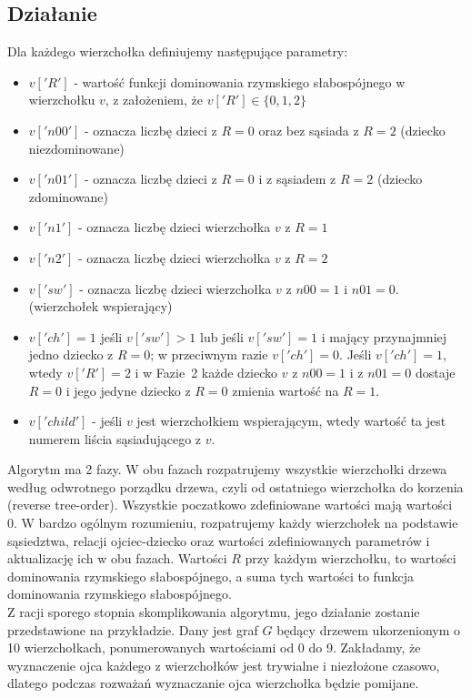 \subsection{Działanie}

Dla każdego wierzchołka definiujemy następujące parametry:
\begin{itemize}
    \item $v['R']$ - wartość funkcji dominowania rzymskiego słabospójnego w wierzchołku $v$, z założeniem, że $v['R']\in\{0,1,2\}$
    \item $v['n00']$ - oznacza liczbę dzieci z $R=0$ oraz bez sąsiada z $R=2$ (dziecko niezdominowane)
    \item $v['n01']$ - oznacza liczbę dzieci z $R=0$ i z sąsiadem z $R=2$ (dziecko zdominowane)
    \item $v['n1']$ - oznacza liczbę dzieci wierzchołka $v$ z $R = 1$
    \item $v['n2']$ - oznacza liczbę dzieci wierzchołka $v$ z $R = 2$
    \item $v['sw']$ - oznacza liczbę dzieci wierzchołka $v$ z $n00=1$ i $n01=0$. (wierzchołek wspierający)
    \item $v['ch'] =1$ jeśli $v['sw']>1$ lub jeśli $v['sw']=1$ i mający przynajmniej jedno dziecko z $R=0$; w przeciwnym razie $v['ch'] =0$. Jeśli $v['ch'] =1$, wtedy $v['R']=2$ i w Fazie~2 każde dziecko $v$ z $n00=1$ i z $n01=0$ dostaje $R=0$ i jego jedyne dziecko z $R=0$ zmienia wartość na $R=1$.
    \item $v['child']$ - jeśli $v$ jest wierzchołkiem wspierającym, wtedy wartość ta jest numerem liścia sąsiadującego z $v$.
\end{itemize}

Algorytm ma 2 fazy. W obu fazach rozpatrujemy wszystkie wierzchołki drzewa według odwrotnego porządku drzewa, czyli od ostatniego wierzchołka do korzenia (reverse tree-order). Wszystkie poczatkowo zdefiniowane wartości mają wartości 0. W bardzo ogólnym rozumieniu, rozpatrujemy każdy wierzchołek na podstawie sąsiedztwa, relacji ojciec-dziecko oraz wartości zdefiniowanych parametrów i aktualizację ich w obu fazach. Wartości $R$ przy każdym wierzchołku, to wartości dominowania rzymskiego słabospójnego, a suma tych wartości to funkcja dominowania rzymskiego słabospójnego.
\\
Z racji sporego stopnia skomplikowania algorytmu, jego działanie zostanie przedstawione na przykładzie.
Dany jest graf $G$ będący drzewem ukorzenionym o 10 wierzchołkach, ponumerowanych wartościami od 0 do 9. Zakładamy, że wyznaczenie ojca każdego z wierzchołków jest trywialne i niezłożone czasowo, dlatego podczas rozważań wyznaczanie ojca wierzchołka będzie pomijane.

